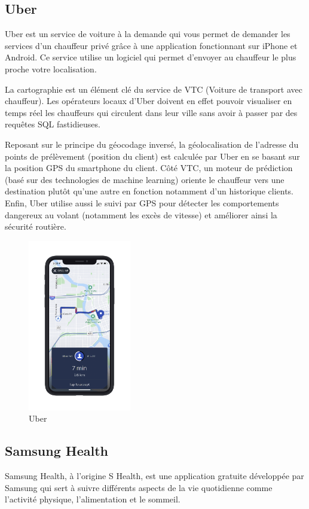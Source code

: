 \subsection{Uber}
Uber est un service de voiture à la demande qui vous permet de demander les services d'un chauffeur privé grâce à une application fonctionnant sur iPhone et Android. Ce service utilise un logiciel qui permet d'envoyer au chauffeur le plus proche votre localisation.

La cartographie est un élément clé du service de VTC (Voiture de transport avec chauffeur). Les opérateurs locaux d'Uber doivent en effet pouvoir visualiser en temps réel les chauffeurs qui circulent dans leur ville sans avoir à passer par des requêtes SQL fastidieuses.

Reposant sur le principe du géocodage inversé, la géolocalisation de l'adresse du points de prélèvement (position du client) est calculée par Uber en se basant sur la position GPS du smartphone du client. Côté VTC, un moteur de prédiction (basé sur des technologies de machine learning) oriente le chauffeur vers une destination plutôt qu'une autre en fonction notamment d'un historique clients. Enfin, Uber utilise aussi le suivi par GPS pour détecter les comportements dangereux au volant (notamment les excès de vitesse) et améliorer ainsi la sécurité routière.

\begin{figure}[h!]
    \center
    \includegraphics[width=0.4\textwidth]{Images/chapter1/uber.PNG}
    \caption{Uber}
    \label{fig:Application}
\end{figure}

\subsection{Samsung Health}
Samsung Health, à l'origine S Health, est une application gratuite développée par Samsung qui sert à suivre différents aspects de la vie quotidienne comme l'activité physique, l'alimentation et le sommeil.

